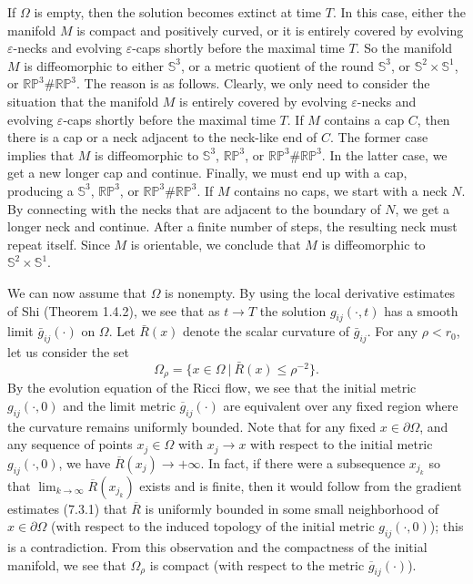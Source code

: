 If $\Omega$ is empty, then the solution becomes extinct at time
$T$. In this case, either the manifold $M$ is compact and
positively curved, or it is entirely covered by evolving
$\varepsilon$-necks and evolving $\varepsilon$-caps shortly before
the maximal time $T$. So the manifold $M$ is diffeomorphic to
either $\mathbb{S}^3$, or a metric quotient of the round
$\mathbb{S}^3$, or $\mathbb{S}^2\times \mathbb{S}^1$, or
$\mathbb{RP}^3\#\mathbb{RP}^3$. The reason is as follows. Clearly,
we only need to consider the situation that the manifold $M$ is
entirely covered by evolving $\varepsilon$-necks and evolving
$\varepsilon$-caps shortly before the maximal time $T$. If $M$
contains a cap $C$, then there is a cap or a neck adjacent to the
neck-like end of $C$. The former case implies that $M$ is
diffeomorphic to $\mathbb{S}^3$, $\mathbb{RP}^3$, or
$\mathbb{RP}^3\#\mathbb{RP}^3$. In the latter case, we get a new
longer cap and continue. Finally, we must end up with a cap,
producing a $\mathbb{S}^3$, $\mathbb{RP}^3$, or
$\mathbb{RP}^3\#\mathbb{RP}^3$. If $M$ contains no caps, we start
with a neck $N$. By connecting with the necks that are adjacent to
the boundary of $N$, we get a longer neck and continue. After a
finite number of steps, the resulting neck must repeat itself.
Since $M$ is orientable, we conclude that $M$ is diffeomorphic to
$\mathbb{S}^2\times \mathbb{S}^1$.

We can now assume that $\Omega$ is nonempty. By using the local
derivative estimates of Shi (Theorem 1.4.2), we see that as
$t\rightarrow T$ the solution $g_{ij}(\cdot,t)$ has a smooth limit
$\bar{g}_{ij}(\cdot)$ on $\Omega$. Let $\bar{R}(x)$ denote the
scalar curvature of $\bar{g}_{ij}$. For any $\rho<r_0$, let us
consider the set
$$
\Omega_\rho=\{x\in\Omega\ |\ \bar{R}(x)\le\rho^{-2}\}.
$$
By the evolution equation of the Ricci flow, we see that the
initial metric $g_{ij}(\cdot,0)$ and the limit metric
$\overline{g}_{ij}(\cdot)$ are equivalent over any fixed region
where the curvature remains uniformly bounded. Note that for any
fixed $x\in
\partial \Omega$, and any sequence of points $x_j\in \Omega$ with
$x_j\rightarrow x$ with respect to the initial metric
$g_{ij}(\cdot,0)$, we have $\overline{R}(x_j)\rightarrow +\infty$.
In fact, if there were a subsequence $x_{j_k}$ so that
$\lim_{k\rightarrow \infty}\overline{R}(x_{j_k})$ exists and is
finite, then it would follow from the gradient estimates (7.3.1)
that $\overline{R}$ is uniformly bounded in some small
neighborhood of $x\in \partial \Omega$ (with respect to the
induced topology of the initial metric $g_{ij}(\cdot,0)$); this is
a contradiction. From this observation and the compactness of the
initial manifold, we see that $\Omega_{\rho}$ is compact (with
respect to the metric $\overline{g}_{ij}(\cdot)$).


